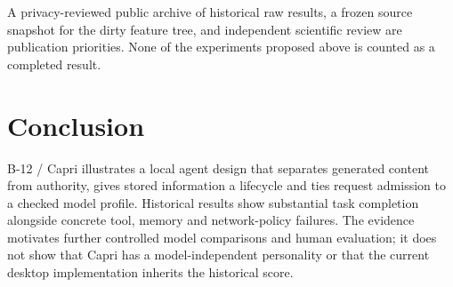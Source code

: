 \documentclass[11pt]{article}
\begin{document}
A privacy-reviewed public archive of historical raw results, a frozen source snapshot for the dirty feature tree, and independent scientific review are publication priorities. None of the experiments proposed above is counted as a completed result.

\section{Conclusion}
B-12 / Capri illustrates a local agent design that separates generated content from authority, gives stored information a lifecycle and ties request admission to a checked model profile. Historical results show substantial task completion alongside concrete tool, memory and network-policy failures. The evidence motivates further controlled model comparisons and human evaluation; it does not show that Capri has a model-independent personality or that the current desktop implementation inherits the historical score.



\end{document}
